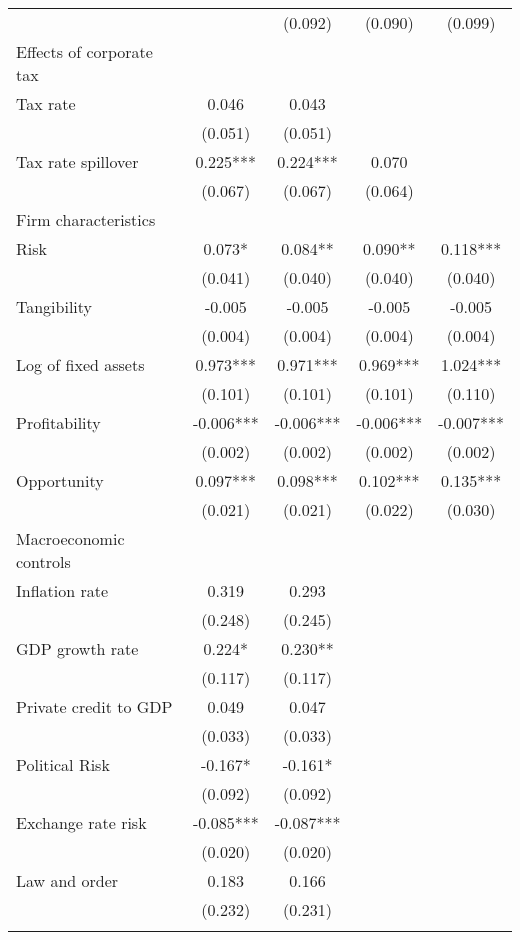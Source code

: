 \begin{longtable}{lcccc}
 &  & (0.092) & (0.090) & (0.099) \\
    Effects of corporate tax &  &  &  \\
\quad Tax rate & 0.046 & 0.043 &  &  \\
 & (0.051) & (0.051) &  &  \\
\quad Tax rate spillover & 0.225*** & 0.224*** & 0.070 &  \\
 & (0.067) & (0.067) & (0.064) &  \\
     Firm characteristics &  &  &  \\
\quad Risk & 0.073* & 0.084** & 0.090** & 0.118*** \\
 & (0.041) & (0.040) & (0.040) & (0.040) \\
\quad Tangibility & -0.005 & -0.005 & -0.005 & -0.005 \\
 & (0.004) & (0.004) & (0.004) & (0.004) \\
\quad Log of fixed assets & 0.973*** & 0.971*** & 0.969*** & 1.024*** \\
 & (0.101) & (0.101) & (0.101) & (0.110) \\
\quad Profitability & -0.006*** & -0.006*** & -0.006*** & -0.007*** \\
 & (0.002) & (0.002) & (0.002) & (0.002) \\
\quad Opportunity & 0.097*** & 0.098*** & 0.102*** & 0.135*** \\
 & (0.021) & (0.021) & (0.022) & (0.030) \\
      Macroeconomic controls &  &  &  \\
\quad Inflation rate & 0.319 & 0.293 &  &  \\
 & (0.248) & (0.245) &  &  \\
\quad GDP growth rate & 0.224* & 0.230** &  &  \\
 & (0.117) & (0.117) &  &  \\
\quad Private credit to GDP & 0.049 & 0.047 &  &  \\
 & (0.033) & (0.033) &  &  \\
\quad Political Risk & -0.167* & -0.161* &  &  \\
 & (0.092) & (0.092) &  &  \\
\quad Exchange rate risk & -0.085*** & -0.087*** &  &  \\
 & (0.020) & (0.020) &  &  \\
\quad Law and order & 0.183 & 0.166 &  &  \\
 & (0.232) & (0.231) &  &  \\
 &  &  &  &  \\

\end{longtable}
